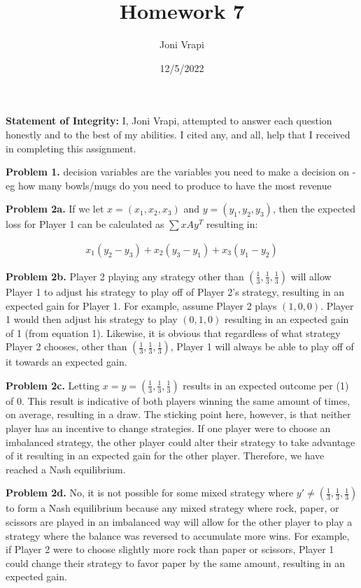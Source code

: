 \documentclass{article}
\title{Homework 7}
\author{Joni Vrapi}
\date{12/5/2022}
\begin{document}
\maketitle

\textbf{Statement of Integrity:} I, Joni Vrapi, attempted to answer each question honestly and to the best of my abilities. I cited any, and all, help that I received in completing this assignment.

\hfill

\textbf{Problem 1.} 
decision variables are the variables you need to make a decision on - eg how many bowls/mugs do you need to produce to have the most revenue

\hfill

\textbf{Problem 2a.} If we let $x = (x_1, x_2, x_3)$ and $y = (y_1, y_2, y_3)$, then the expected loss for Player 1 can be calculated as $\sum{xAy^T}$ resulting in:

\begin{gather}
    x_1(y_2-y_3) + x_2(y_3-y_1) + x_3(y_1-y_2)
\end{gather}

\hfill

\textbf{Problem 2b.} Player 2 playing any strategy other than $(\frac{1}{3}, \frac{1}{3}, \frac{1}{3})$ will allow Player 1 to adjust his strategy to play off of Player 2's strategy, resulting in an expected gain for Player 1. For example, assume Player 2 plays $(1, 0, 0)$. Player 1 would then adjust his strategy to play $(0, 1, 0)$ resulting in an expected gain of 1 (from equation 1). Likewise, it is obvious that regardless of what strategy Player 2 chooses, other than $(\frac{1}{3}, \frac{1}{3}, \frac{1}{3})$, Player 1 will always be able to play off of it towards an expected gain.

\hfill

\textbf{Problem 2c.} Letting $x = y = (\frac{1}{3}, \frac{1}{3}, \frac{1}{3})$ results in an expected outcome per (1) of 0. This result is indicative of both players winning the same amount of times, on average, resulting in a draw. The sticking point here, however, is that neither player has an incentive to change strategies. If one player were to choose an imbalanced strategy, the other player could alter their strategy to take advantage of it resulting in an expected gain for the other player. Therefore, we have reached a Nash equilibrium. 

\hfill

\textbf{Problem 2d.} No, it is not possible for some mixed strategy  where $y' \neq (\frac{1}{3}, \frac{1}{3}, \frac{1}{3})$ to form a Nash equilibrium because any mixed strategy where rock, paper, or scissors are played in an imbalanced way will allow for the other player to play a strategy where the balance was reversed to accumulate more wins. For example, if Player 2 were to choose slightly more rock than paper or scissors, Player 1 could change their strategy to favor paper by the same amount, resulting in an expected gain.
\end{document}

